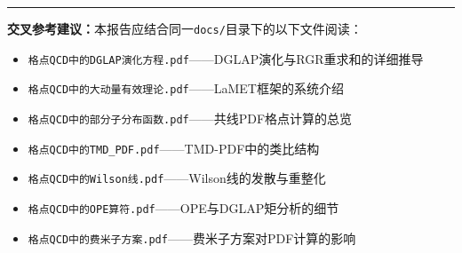 \documentclass[12pt,a4paper]{ctexart}
\theoremstyle{definition}
\begin{document}
\vspace{0.5cm}
\noindent\rule{\textwidth}{0.5pt}
\small
\textbf{交叉参考建议：}本报告应结合同一\texttt{docs/}目录下的以下文件阅读：
\begin{itemize}[nosep]
    \item \texttt{格点QCD中的DGLAP演化方程.pdf}——DGLAP演化与RGR重求和的详细推导
    \item \texttt{格点QCD中的大动量有效理论.pdf}——LaMET框架的系统介绍
    \item \texttt{格点QCD中的部分子分布函数.pdf}——共线PDF格点计算的总览
    \item \texttt{格点QCD中的TMD\_PDF.pdf}——TMD-PDF中的类比结构
    \item \texttt{格点QCD中的Wilson线.pdf}——Wilson线的发散与重整化
    \item \texttt{格点QCD中的OPE算符.pdf}——OPE与DGLAP矩分析的细节
    \item \texttt{格点QCD中的费米子方案.pdf}——费米子方案对PDF计算的影响
\end{itemize}
\end{document}
